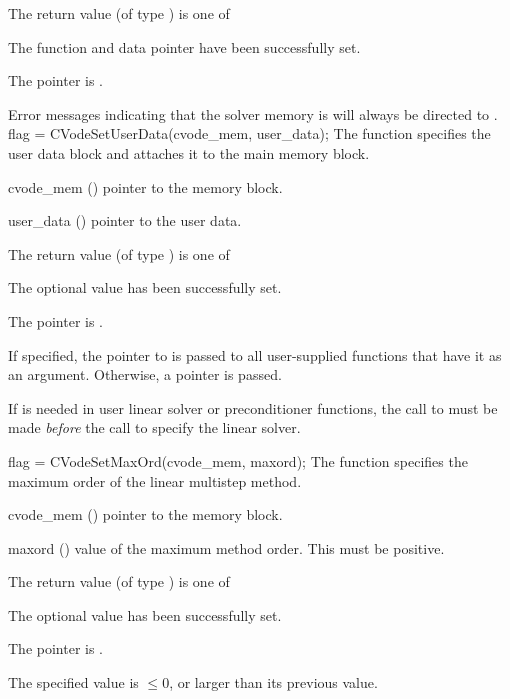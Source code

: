 {
  The return value  (of type ) is one of
  \begin{args}
  \item[\Id{CV\_SUCCESS}]
    The function  and data pointer  have been successfully set.
  \item[\Id{CV\_MEM\_NULL}]
    The  pointer is .
  \end{args}
}
{
  Error messages indicating that the {\cvode} solver memory is  will
  always be directed to .
}
{
  flag = CVodeSetUserData(cvode\_mem, user\_data);
}
{
  The function  specifies the user data block 
  and attaches it to the main {\cvode} memory block.
}
{
  \begin{args}
  \item[cvode\_mem] ()
    pointer to the {\cvode} memory block.
  \item[user\_data] ()
    pointer to the user data.
  \end{args}
}
{
  The return value  (of type ) is one of
  \begin{args}
  \item[\Id{CV\_SUCCESS}]
    The optional value has been successfully set.
  \item[\Id{CV\_MEM\_NULL}]
    The  pointer is .
  \end{args}
}
{
  If specified, the pointer to  is passed to all user-supplied
  functions that have it as an argument. Otherwise, a  pointer is passed.

  {\warn}If  is needed in user linear solver or preconditioner
   functions, the call to  must be made {\it before} the
   call to specify the linear solver.
}
{
flag = CVodeSetMaxOrd(cvode\_mem, maxord);
}
{
  The function  specifies the maximum order of the 
  linear multistep method.
}
{
  \begin{args}
  \item[cvode\_mem] ()
    pointer to the {\cvode} memory block.
  \item[maxord] ()
    value of the maximum method order.  This must be positive.
  \end{args}
}
{
  The return value  (of type ) is one of
  \begin{args}
  \item[\Id{CV\_SUCCESS}]
    The optional value has been successfully set.
  \item[\Id{CV\_MEM\_NULL}]
    The  pointer is .
  \item[\Id{CV\_ILL\_INPUT}]
    The specified value  is $\leq 0$, or larger than
    its previous value.
  \end{args}
}

